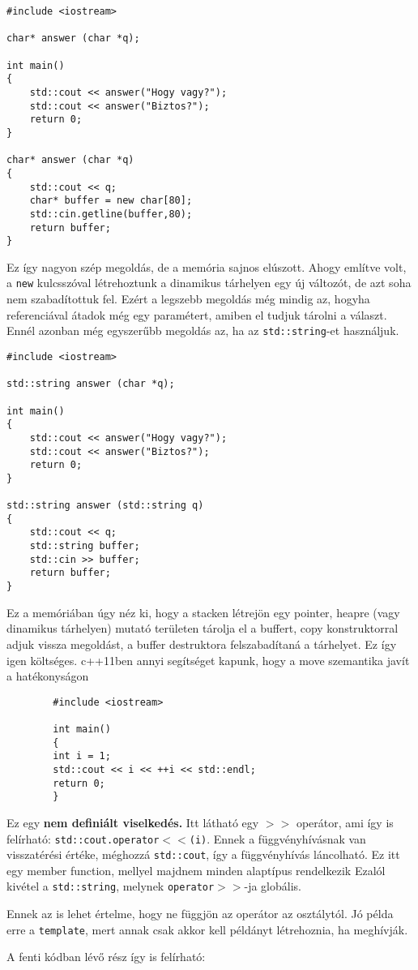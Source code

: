 \documentclass[a4paper,11.5pt]{article}
\begin{document}
		\begin{lstlisting}
#include <iostream>

char* answer (char *q);

int main()
{
	std::cout << answer("Hogy vagy?");
	std::cout << answer("Biztos?");
	return 0;
}

char* answer (char *q)
{
	std::cout << q;
	char* buffer = new char[80];
	std::cin.getline(buffer,80);
	return buffer;
}
		\end{lstlisting}
		Ez így nagyon szép megoldás, de a memória sajnos elúszott. Ahogy említve volt, a \texttt{new} kulcsszóval létrehoztunk a dinamikus tárhelyen egy új változót, de azt soha nem szabadítottuk fel. Ezért a legszebb megoldás még mindig az, hogyha referenciával átadok még egy paramétert, amiben el tudjuk tárolni a választ. Ennél azonban még egyszerűbb megoldás az, ha az \texttt{std::string}-et használjuk.
		\begin{lstlisting}
#include <iostream>

std::string answer (char *q);

int main()
{
	std::cout << answer("Hogy vagy?");
	std::cout << answer("Biztos?");
	return 0;
}

std::string answer (std::string q)
{
	std::cout << q;
	std::string buffer;
	std::cin >> buffer;
	return buffer;
}
		\end{lstlisting}
		
		Ez a memóriában úgy néz ki, hogy a stacken létrejön egy pointer, heapre (vagy dinamikus tárhelyen) mutató területen tárolja el a buffert, copy konstruktorral adjuk vissza megoldást, a buffer destruktora felszabadítaná a tárhelyet. Ez így igen költséges. c++11ben annyi segítséget kapunk, hogy a move szemantika javít a hatékonyságon
	
	\begin{example}
		\begin{lstlisting}
		#include <iostream>
		
		int main()
		{
		int i = 1;
		std::cout << i << ++i << std::endl;
		return 0;
		}
		\end{lstlisting}
	\end{example}
	
	Ez egy \textbf{nem definiált viselkedés.} Itt látható egy \texttt{$>>$} operátor, ami így is felírható: \texttt{std::cout.operator$<<$(i)}. Ennek a függvényhívásnak van visszatérési értéke, méghozzá \texttt{std::cout}, így a függvényhívás láncolható. Ez itt egy member function, mellyel majdnem minden alaptípus  rendelkezik Ezalól kivétel a \texttt{std::string}, melynek \texttt{operator$>>$}-ja globális.
	\begin{note}
		Ennek az is lehet értelme, hogy ne függjön az operátor az osztálytól. Jó példa erre a \texttt{template}, mert annak csak akkor kell példányt létrehoznia, ha meghívják.
	\end{note}
	A fenti kódban lévő rész így is felírható:
	
\end{document}
